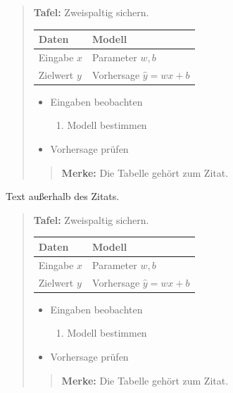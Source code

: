 \begin{quote}
\textbf{Tafel:} Zweispaltig sichern.

\par\addvspace{\medskipamount}
\noindent\begin{tabularx}{\linewidth}{@{}>{\raggedright\arraybackslash}p{}>{\raggedright\arraybackslash}X@{}}
\toprule
Daten & Modell \\
\midrule
Eingabe $x$ & Parameter $w,b$ \\
Zielwert $y$ & Vorhersage $\hat y=wx+b$ \\
\bottomrule
\end{tabularx}
\par\addvspace{\medskipamount}

\begin{itemize}
\item Eingaben beobachten
\begin{enumerate}
\item Modell bestimmen
\end{enumerate}
\item Vorhersage prüfen
\end{itemize}

\begin{quote}
\textbf{Merke:} Die Tabelle gehört zum Zitat.
\end{quote}
\end{quote}

Text außerhalb des Zitats.

\begin{quote}
\textbf{Tafel:} Zweispaltig sichern.

\par\addvspace{\medskipamount}
\noindent\begin{tabularx}{\linewidth}{@{}>{\raggedright\arraybackslash}p{}>{\raggedright\arraybackslash}X@{}}
\toprule
Daten & Modell \\
\midrule
Eingabe $x$ & Parameter $w,b$ \\
Zielwert $y$ & Vorhersage $\hat y=wx+b$ \\
\bottomrule
\end{tabularx}
\par\addvspace{\medskipamount}

\begin{itemize}
\item Eingaben beobachten
\begin{enumerate}
\item Modell bestimmen
\end{enumerate}
\item Vorhersage prüfen
\end{itemize}

\begin{quote}
\textbf{Merke:} Die Tabelle gehört zum Zitat.
\end{quote}
\end{quote}

